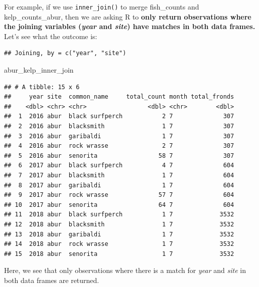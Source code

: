 \documentclass[]{book}
\newenvironment{Shaded}{\begin{snugshade}}{\end{snugshade}}
\newcommand{\KeywordTok}[1]{\textcolor[rgb]{0.13,0.29,0.53}{\textbf{#1}}}
\newcommand{\NormalTok}[1]{#1}
\newcommand{\OperatorTok}[1]{\textcolor[rgb]{0.81,0.36,0.00}{\textbf{#1}}}
\newcommand{\StringTok}[1]{\textcolor[rgb]{0.31,0.60,0.02}{#1}}
\begin{document}
For example, if we use \texttt{inner\_join()} to merge fish\_counts and kelp\_counts\_abur, then we are asking R to \textbf{only return observations where the joining variables (\emph{year} and \emph{site}) have matches in both data frames.} Let's see what the outcome is:

\begin{Shaded}
\end{Shaded}

\begin{verbatim}
## Joining, by = c("year", "site")
\end{verbatim}

\begin{Shaded}
\begin{Highlighting}[]
\NormalTok{abur_kelp_inner_join}
\end{Highlighting}
\end{Shaded}

\begin{verbatim}
## # A tibble: 15 x 6
##     year site  common_name     total_count month total_fronds
##    <dbl> <chr> <chr>                 <dbl> <chr>        <dbl>
##  1  2016 abur  black surfperch           2 7              307
##  2  2016 abur  blacksmith                1 7              307
##  3  2016 abur  garibaldi                 1 7              307
##  4  2016 abur  rock wrasse               2 7              307
##  5  2016 abur  senorita                 58 7              307
##  6  2017 abur  black surfperch           4 7              604
##  7  2017 abur  blacksmith                1 7              604
##  8  2017 abur  garibaldi                 1 7              604
##  9  2017 abur  rock wrasse              57 7              604
## 10  2017 abur  senorita                 64 7              604
## 11  2018 abur  black surfperch           1 7             3532
## 12  2018 abur  blacksmith                1 7             3532
## 13  2018 abur  garibaldi                 1 7             3532
## 14  2018 abur  rock wrasse               1 7             3532
## 15  2018 abur  senorita                  1 7             3532
\end{verbatim}

Here, we see that only observations where there is a match for \emph{year} and \emph{site} in both data frames are returned.
\end{document}
